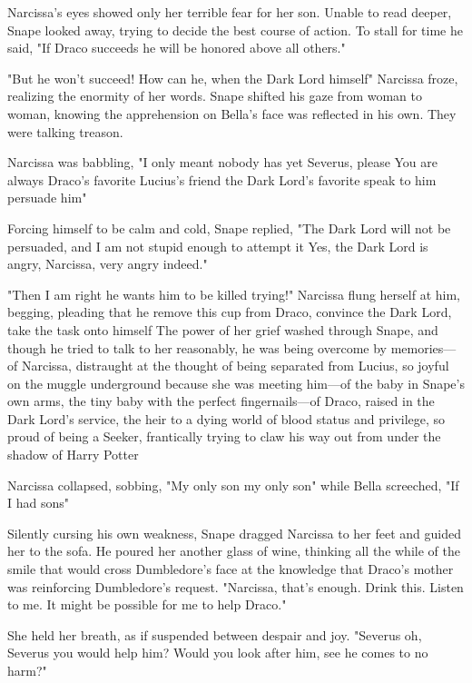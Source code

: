 Narcissa's eyes showed only her terrible fear for her son. Unable to read deeper, Snape looked away, trying to decide the best course of action. To stall for time he said, "If Draco succeeds he will be honored above all others."

"But he won't succeed! How can he, when the Dark Lord himself{\el}" Narcissa froze, realizing the enormity of her words. Snape shifted his gaze from woman to woman, knowing the apprehension on Bella's face was reflected in his own. They were talking treason.

Narcissa was babbling, "I only meant{\el} nobody has yet{\el} Severus, please{\el} You are{\el} always{\el} Draco's favorite{\el} Lucius's friend{\el} the Dark Lord's favorite{\el} speak to him{\el} persuade him{\el}"

Forcing himself to be calm and cold, Snape replied, "The Dark Lord will not be persuaded, and I am not stupid enough to attempt it{\el} Yes, the Dark Lord is angry, Narcissa, very angry indeed."

"Then I am right{\el} he wants him to be killed trying!" Narcissa flung herself at him, begging, pleading that he remove this cup from Draco, convince the Dark Lord, take the task onto himself{\el} The power of her grief washed through Snape, and though he tried to talk to her reasonably, he was being overcome by memories—of Narcissa, distraught at the thought of being separated from Lucius, so joyful on the muggle underground because she was meeting him—of the baby in Snape's own arms, the tiny baby with the perfect fingernails—of Draco, raised in the Dark Lord's service, the heir to a dying world of blood status and privilege, so proud of being a Seeker, frantically trying to claw his way out from under the shadow of Harry Potter{\el}

Narcissa collapsed, sobbing, "My only son{\el} my only son{\el}" while Bella screeched, "If I had sons{\el}"

Silently cursing his own weakness, Snape dragged Narcissa to her feet and guided her to the sofa. He poured her another glass of wine, thinking all the while of the smile that would cross Dumbledore's face at the knowledge that Draco's mother was reinforcing Dumbledore's request. "Narcissa, that's enough. Drink this. Listen to me. It might be possible{\el} for me to help Draco."

She held her breath, as if suspended between despair and joy. "Severus{\el} oh, Severus{\el} you would help him? Would you look after him, see he comes to no harm?"

